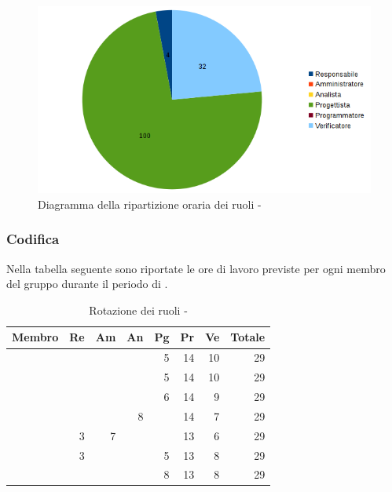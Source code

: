 \documentclass[12pt,a4paper]{article}
\begin{document}
\begin{center}
	\begin{figure}[H]
		\centering	
        \includegraphics[width=\textwidth]{../img/diagrammaTortaProgettazioneDiDettaglioTotaleOre.png}
		\caption{Diagramma della ripartizione oraria dei ruoli - \FPD{}}
	\end{figure}
\end{center}

\newpage
\subsubsection{Codifica}

Nella tabella seguente sono riportate le ore di lavoro previste per ogni membro del gruppo durante il periodo di \FC.

\begin{table}[H]
	\begin{center}
		\begin{tabular}{l r r r r r r r}
			\toprule
			\textbf{Membro}	&	\textbf{Re}	&	\textbf{Am}	& \textbf{An} & \textbf{Pg} & \textbf{Pr} & \textbf{Ve} & \textbf{Totale}\\
			\midrule
			\midrule
			\IB{} & & & & 5 & 14 & 10 & 29 \\
			\midrule
			\AB{} & & & & 5 & 14 & 10 & 29 \\
			\midrule
			\NDC{} & & & & 6 & 14 & 9 & 29 \\
			\midrule
			\TP{} & & & 8 & & 14 & 7 & 29 \\
			\midrule
			\WS{} & 3 & 7 & & & 13 & 6 & 29 \\
			\midrule
			\AVE{} & 3 & & & 5 & 13 & 8 & 29 \\
			\midrule
			\AVI{} & & & & 8 & 13 & 8 & 29 \\
			\bottomrule
		\end{tabular}
		\caption{Rotazione dei ruoli - \FPDC{}}
	\end{center}
\end{table}
\end{document}
